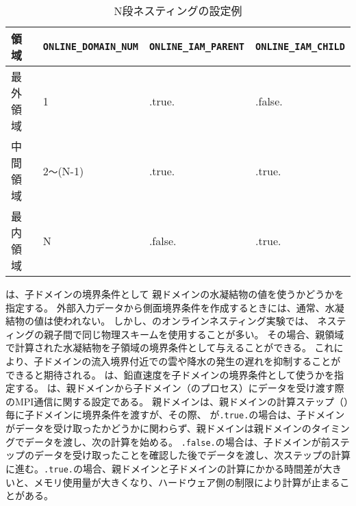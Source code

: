 \begin{table}[htb]
\begin{center}
\caption{N段ネスティングの設定例}
\begin{tabularx}{150mm}{|l|l|l|X|} \hline
 \rowcolor[gray]{0.9} 領域 & \verb|ONLINE_DOMAIN_NUM| & \verb|ONLINE_IAM_PARENT| & \verb|ONLINE_IAM_CHILD|\\ \hline
 最外領域 & 1               & .true.  & .false. \\ \hline
 中間領域 & 2\verb|〜|(N-1) & .true.  & .true. \\ \hline
 最内領域 & N               & .false. & .true. \\ \hline
\end{tabularx}
\label{tab:triple_nested}
\end{center}
\end{table}

は、子ドメインの境界条件として
親ドメインの水凝結物の値を使うかどうかを指定する。
外部入力データから側面境界条件を作成するときには、通常、水凝結物の値は使われない。
しかし、\scalerm のオンラインネスティング実験では、
ネスティングの親子間で同じ物理スキームを使用することが多い。
その場合、親領域で計算された水凝結物を子領域の境界条件として与えることができる。
これにより、子ドメインの流入境界付近での雲や降水の発生の遅れを抑制することが
できると期待される。
は、鉛直速度を子ドメインの境界条件として使うかを指定する。
は、親ドメインから子ドメイン（のプロセス）にデータを受け渡す際のMPI通信に関する設定である。
親ドメインは、親ドメインの計算ステップ（）毎に子ドメインに境界条件を渡すが、その際、
が\verb|.true.|の場合は、子ドメインがデータを受け取ったかどうかに関わらず、親ドメインは親ドメインのタイミングでデータを渡し、次の計算を始める。
\verb|.false.|の場合は、子ドメインが前ステップのデータを受け取ったことを確認した後でデータを渡し、次ステップの計算に進む。\verb|.true.|の場合、親ドメインと子ドメインの計算にかかる時間差が大きいと、メモリ使用量が大きくなり、ハードウェア側の制限により計算が止まることがある。



